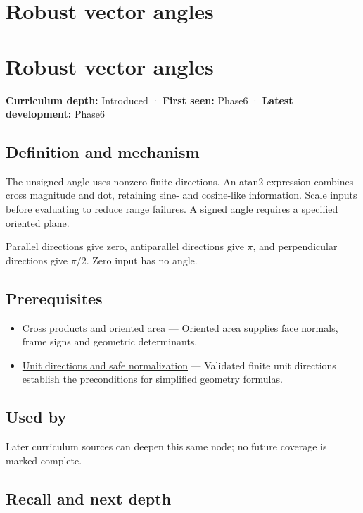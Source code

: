 \hypertarget{appendix-e569e60e18e6}{}
\section*{Robust vector angles}
\section{Robust vector angles}\label{robust-vector-angles}

\textbf{Curriculum depth:} Introduced · \textbf{First seen:} Phase6 · \textbf{Latest development:} Phase6

\subsection{Definition and mechanism}\label{definition-and-mechanism}

The unsigned angle uses nonzero finite directions. An atan2 expression combines cross magnitude and dot, retaining sine- and cosine-like information. Scale inputs before evaluating to reduce range failures. A signed angle requires a specified oriented plane.

Parallel directions give zero, antiparallel directions give \(\pi\), and perpendicular directions give \(\pi/2\). Zero input has no angle.

\subsection{Prerequisites}\label{prerequisites}

\begin{itemize}
\tightlist
\item
  \hyperref[appendix-2391db8052b1]{Cross products and oriented area} --- Oriented area supplies face normals, frame signs and geometric determinants.
\item
  \hyperref[appendix-f744e41b95b4]{Unit directions and safe normalization} --- Validated finite unit directions establish the preconditions for simplified geometry formulas.
\end{itemize}

\subsection{Used by}\label{used-by}

Later curriculum sources can deepen this same node; no future coverage is marked complete.

\subsection{Recall and next depth}\label{recall-and-next-depth}

